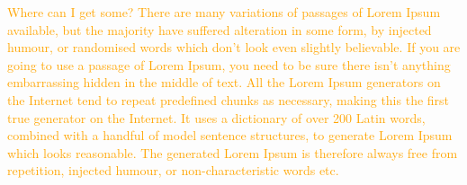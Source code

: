 \documentclass[a4paper,12pt,twoside]{report}
\begin{document}
		\centering{\textcolor{magenta}{Why do we use it? It is a long established fact that a reader will be distracted by the readable content of a page when looking at its layout. The point of using Lorem Ipsum is that it has a more-or-less normal distribution of letters, as opposed to using 'Content here, content here', making it look like readable English. Many desktop publishing packages and web page editors now use Lorem Ipsum as their default model text, and a search for 'lorem ipsum' will uncover many web sites still in their infancy. Various versions have evolved over the years, sometimes by accident, sometimes on purpose (injected humour and the like).}}\par
	\setlength{\parindent}{0cm}
		\raggedright{\textcolor{orange}{Where can I get some? There are many variations of passages of Lorem Ipsum available, but the majority have suffered alteration in some form, by injected humour, or randomised words which don't look even slightly believable. If you are going to use a passage of Lorem Ipsum, you need to be sure there isn't anything embarrassing hidden in the middle of text. All the Lorem Ipsum generators on the Internet tend to repeat predefined chunks as necessary, making this the first true generator on the Internet. It uses a dictionary of over 200 Latin words, combined with a handful of model sentence structures, to generate Lorem Ipsum which looks reasonable. The generated Lorem Ipsum is therefore always free from repetition, injected humour, or non-characteristic words etc.}}
	
\end{document}
